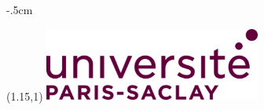 
\begin{titlepage}
    \storeareas{\DefaultMargins}
    \areaset%
    {\textwidth} %
    {\dimexpr\the\paperheight-.5cm\relax} %
    \begin{textblock}{1} (1.15,1)
        \includegraphics[height=2.4cm]{../gfx/UPSac.png}
    \end{textblock}


\end{titlepage}
